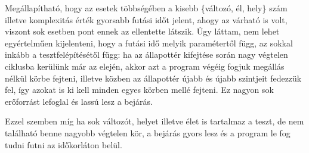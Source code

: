 Megállapítható, hogy az esetek többségében a kisebb  \{változó, él, hely\} szám illetve komplexitás érték gyorsabb futási időt jelent, ahogy az várható is volt, viszont sok esetben pont ennek az ellentette látszik. Úgy láttam, nem lehet egyértelműen kijelenteni, hogy a futási idő melyik paramétertől függ, az sokkal inkább a tesztfelépítésétől függ: ha az állapottér kifejtése során nagy végtelen ciklusba kerülünk már az elején, akkor azt a program végéig fogjuk megállás nélkül körbe fejteni, illetve közben az állapottér újabb és újabb szintjeit fedezzük fel, így azokat is ki kell minden egyes körben mellé fejteni. Ez nagyon sok erőforrást lefoglal és lassú lesz a bejárás.

Ezzel szemben míg ha sok változót, helyet illetve élet is tartalmaz a teszt, de nem található benne nagyobb végtelen kör, a bejárás gyors lesz és a program le fog tudni futni az időkorláton belül.
